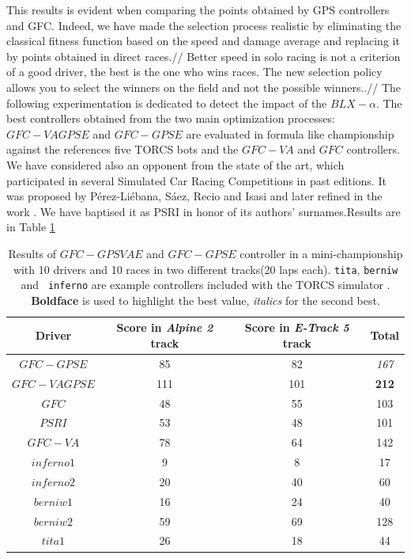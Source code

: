 \documentclass[10pt,journal,compsoc]{IEEEtran}
\begin{document}
This results is evident when comparing the points obtained by GPS controllers and GFC.
Indeed, we have made the selection process  realistic by eliminating the classical fitness function based on the speed and damage average and replacing it by points obtained in direct races.//
Better speed in solo racing is not a criterion of a good driver, the best is the one who wins races. The new selection policy allows you to select the winners on the field and not the possible winners..//
The following experimentation is dedicated to detect the impact of the $BLX-\alpha$.
The best controllers obtained from the two main optimization processes: $GFC-VAGPSE$ and $GFC-GPSE$ are evaluated in formula like championship against the references five TORCS bots and the $GFC-VA$ and $GFC$ controllers. We have considered also an opponent from the state of the art, which participated in several Simulated Car Racing Competitions in past editions. 
It was proposed by P{\'e}rez-Li{\'e}bana, S{\'a}ez, Recio and Isasi \cite{EvolvingRuleSystem08} and later refined in the work \cite{PerezEvolvingFuzzy09}. We have baptised it as PSRI in honor of its authors' surnames.Results are in Table \ref{tab:allsresults}
%
\begin{table}[ht]
	\centering
	{\scriptsize
		\caption{ Results of $GFC-GPSVAE$ and $GFC-GPSE$ controller in a mini-championship with 10 drivers and 10
			races in two different tracks(20 laps each). {\tt tita}, {\tt berniw} and {\tt
				inferno} are example controllers included with the TORCS
			simulator \cite{torcs4}.  {\bf Boldface} is
                        used to highlight the best value, {\em italics} for the second
                    best.}
		{
			\begin{tabular}{|c|c|c||c|}
				\hline
				Driver&Score in \textit{Alpine 2} track &Score in \textit{E-Track 5} track &Total\\
				\hline
				\hline
$GFC-GPSE$&	85&	82&	{\em 167}\\
$GFC-VAGPSE$&111&101&            {\bf 212}\\
$GFC$&		48&	55&	103\\
$PSRI$&		53&	48&	101\\
$GFC-VA$&	78&	64&	142\\
$inferno1$&	9&	8&	17\\
$inferno2$&	20&	40&	60\\
$berniw1$&	16&	24&	40\\
$berniw2$&	59&	69&	128\\
$tita1$&	26&	18&	44\\
					\hline
				
			\end{tabular}
		}\label{tab:allsresults}
	}
\end{table}
%
\end{document}
